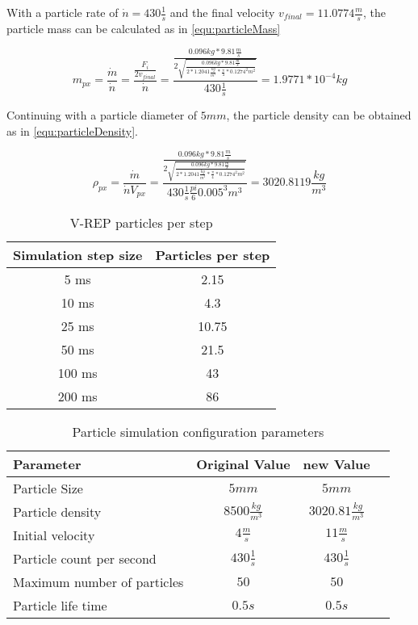     With a particle rate of $\dot n = 430 \frac{1}{s}$ and the final velocity $v_{final} = 11.0774 \frac{m}{s}$, the particle mass can be calculated as in \ref{equ:particleMass}
  
   \begin{equation}
    m_{px}= \frac{\dot m}{\dot n}=\frac{\frac{F_i}{2 v_{final} }}{\dot n} = \frac{\frac{0.096 kg * 9.81 \frac{m}{s}}{2 \sqrt{\frac{ 0.096 kg * 9.81 \frac{m}{s}}{2 * 1.2041 \frac{kg}{m^3} * \frac{\pi}{4} * 0.1274^2 m^2}} }}{430 \frac{1}{s}} = 1.9771 * 10^{-4} kg
    \label{equ:particleMass}
 \end{equation}
    
    Continuing with a particle diameter of $5mm$, the particle density can be obtained as in \ref{equ:particleDensity}.
  
      
   \begin{equation}
    \rho_{px}= \frac{\dot m}{\dot n V_{px}} = \frac{\frac{0.096 kg * 9.81 \frac{m}{s}}{2 \sqrt{\frac{ 0.096 kg * 9.81 \frac{m}{s}}{2 * 1.2041 \frac{kg}{m^3} * \frac{\pi}{4} * 0.1274^2 m^2}} }}{430 \frac{1}{s} \frac{pi}{6} 0.005^3 m^3} = 3020.8119 \frac{kg}{m^3}
    \label{equ:particleDensity}
 \end{equation}
    
\begin{table}[h]
	\centering
	\begin{tabular}{|c|c|}
    		\hline
		Simulation step size & Particles per step \\
		\hline
    		5 ms & 2.15\\
    		\hline
    		10 ms & 4.3  \\
    		\hline
    		25 ms  & 10.75\\
    		\hline
    		50 ms & 21.5 \\
    		\hline
		100 ms & 43 \\
    		\hline
		200 ms & 86 \\
    		\hline
	\end{tabular}
    	\caption{V-REP particles per step}
      	\label{tab:particleNum}
\end{table}


\begin{table}[h]
	\centering
	\begin{tabular}{|l|c|c|c|}
    		\hline
		Parameter & Original Value & new Value \\
		\hline
    		Particle Size & $5 mm$ &  $5 mm$\\
    		\hline
		Particle density & $ 8500 \frac{kg}{m^3} $ & $3020.81 \frac{kg}{m^3} $   \\
    		\hline
		Initial velocity & $ 4 \frac{m}{s}$ & $11 \frac{m}{s}$  \\
    		\hline
		Particle count per second & $430 \frac{1}{s}$ & $430 \frac{1}{s}$ \\
    		\hline
		Maximum number of particles & $50$ & $50$ \\
    		\hline
		Particle life time & $0.5 s$ & $0.5s$ \\
    		\hline
	\end{tabular}
    	\caption{Particle simulation configuration parameters}
      	\label{tab:particleConf}
\end{table}

